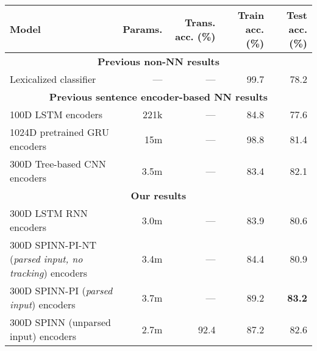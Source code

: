 \documentclass[11pt]{article}
\newcommand\result[1]{\textcolor{red}{\textbf{RESULT NEEDED:} #1}}
\def\ii#1{\textit{#1}}
\begin{document}
\begin{table*}[t]
  \centering\small
  \begin{tabular}{lrrrr}
    \toprule
Model                   & Params.    & Trans. acc. (\%)  &   Train acc. (\%)  &   Test acc. (\%) \\
\midrule
\multicolumn{5}{c}{\textbf{Previous non-NN results}}\\
Lexicalized classifier \citep{snli:emnlp2015}
                        & ---                & ---                    &   99.7   &   78.2      \\
\midrule
\multicolumn{5}{c}{\textbf{Previous sentence encoder-based NN results}}\\
100D LSTM encoders \citep{snli:emnlp2015}
                        & 221k               & ---               &   84.8   &   77.6      \\
1024D pretrained GRU encoders \citep{DBLP:journals/corr/VendrovKFU15}
                        & 15m                & ---              &   98.8   &   81.4       \\
300D Tree-based CNN encoders \citep{mou2015recognizing}
                        & 3.5m                & ---             &   83.4   &   82.1       \\
\midrule
\multicolumn{5}{c}{\textbf{Our results}}\\
300D LSTM RNN encoders         & 3.0m                  & ---                &   83.9      &   80.6       \\
300D SPINN-PI-NT (\ii{parsed input, no tracking}) encoders
                        & 3.4m                  & ---                &   84.4      &   80.9       \\
300D SPINN-PI (\ii{parsed input}) encoders
                        & 3.7m                  & ---                &   89.2      &   \textbf{83.2}       \\
300D SPINN (unparsed input) encoders
                        & 2.7m                  & 92.4           &   87.2    &   82.6      \\

\end{tabular}
\end{table*}
\end{document}
